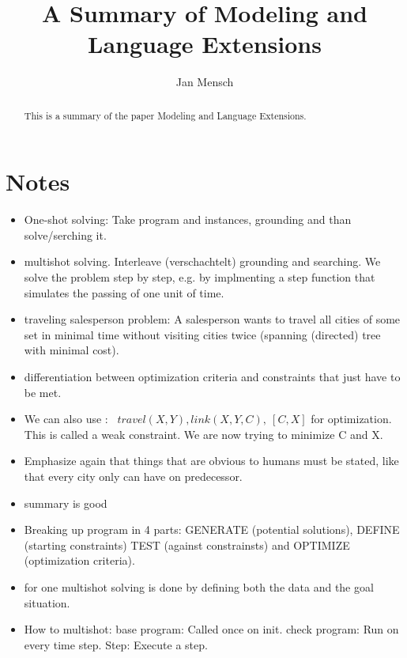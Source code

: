 \documentclass[runningheads]{llncs}
\newcommand{\papertitle}{Modeling and Language Extensions}
\begin{document}
%
\title{A Summary of \papertitle}
%
%
\author{Jan Mensch}
%
%



%
\maketitle              %
%
\begin{abstract}
This is a summary of the paper \papertitle. 



\end{abstract}
%
%
%

\section{Notes}


\begin{itemize}
    \item One-shot solving: Take program and instances, grounding and than solve/serching it. 
    \item multishot solving. Interleave (verschachtelt) grounding and searching. We solve the problem step by step, e.g. by implmenting a step function that simulates the passing of one unit of time.
    \item traveling salesperson problem: A salesperson wants to travel all cities of some set in minimal time without visiting cities twice (spanning (directed) tree with minimal cost). 
    \item differentiation between optimization criteria and constraints that just have to be met.
    \item We can also use :~ $travel(X,Y), link(X,Y,C),~[C,X]$ for optimization. This is called a weak constraint. We are now trying to minimize C and X. \item Emphasize again that things that are obvious to humans must be stated, like that every city only can have on predecessor. 
    \item summary is good
    \item Breaking up program in 4 parts: GENERATE (potential solutions), DEFINE (starting constraints) TEST (against constrainsts) and OPTIMIZE (optimization criteria). 
    \item for one multishot solving is done by defining both the data and the goal situation. 
    \item How to multishot: base program: Called once on init.  check program: Run on every time step. Step: Execute a step.
\end{itemize}
\end{document}
